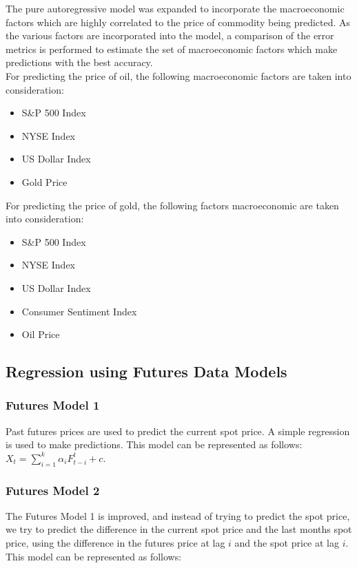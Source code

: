 \documentclass[runningheads]{llncs}
\begin{document}
\noindent The pure autoregressive model was expanded to incorporate the macroeconomic factors which are highly correlated to the price of commodity being predicted. As the various factors are incorporated into the model, a comparison of the error metrics is performed to estimate the set of macroeconomic factors which make predictions with the best accuracy. \\


\noindent For predicting the price of oil, the following macroeconomic factors are taken into consideration:
\begin {itemize}
\item S\&P 500 Index
\item NYSE Index
\item US Dollar Index
\item Gold Price
\end {itemize}

\noindent For predicting the price of gold, the following factors macroeconomic are taken into consideration:
\begin {itemize}
\item S\&P 500 Index
\item NYSE Index
\item US Dollar Index
\item Consumer Sentiment Index
\item Oil Price
\end {itemize}

\subsection{Regression using Futures Data Models}

\subsubsection{Futures Model 1}
Past futures prices are used to predict the current spot price. A simple regression is used to make predictions. This model can be represented as follows:\\

$X_t = \sum\limits_{i=1}^k \alpha_{i}F_{t-i}^t + c$.\\

\subsubsection{Futures Model 2}
\noindent The Futures Model 1 is improved, and instead of trying to predict the spot price, we try to predict the difference in the current spot price and the last months spot price, using the difference in the futures price at lag $i$ and the spot price at lag $i$. This model can be represented as follows:\\
\end{document}
